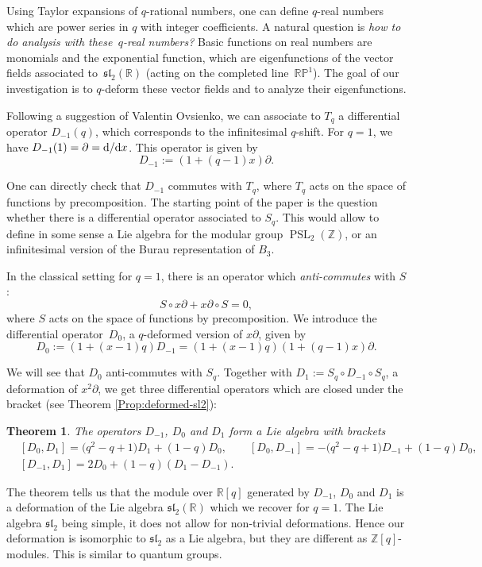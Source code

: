 \documentclass[10pt,a4paper]{amsart}
\numberwithin{equation}{section}
\newtheorem{Theorem}{Theorem}[section]
\newcommand*{\R}{\mathbb{R}}
\newcommand*{\Z}{\mathbb{Z}}
\DeclareMathOperator{\PSL}{PSL}
\begin{document}
Using Taylor expansions of $q$-rational numbers, one can define $q$-real numbers \cite{morier2022q} which are power series in $q$ with integer coefficients. A natural question is \emph{how to do analysis with these~$q$-real numbers?} Basic functions on real numbers are monomials and the exponential function, which are eigenfunctions of the vector fields associated to~$\mathfrak{sl}_2(\R)$ \big(acting on the completed line~$\mathbb{RP}^1$\big). The goal of our investigation is to $q$-deform these vector fields and to analyze their eigenfunctions.

Following a suggestion of Valentin Ovsienko, we can associate to $T_q$ a differential operator $D_{-1}(q)$, which corresponds to the infinitesimal $q$-shift. For $q = 1$, we have ${D_{-1}(1)=\partial={\rm d}/{\rm d}x}$. This operator is given by
\[
D_{-1}:=(1+(q-1)x)\partial.
\]

One can directly check that $D_{-1}$ commutes with $T_q$, where $T_q$ acts on the space of functions by precomposition.
The starting point of the paper is the question whether there is a differential operator associated to $S_q$. This would allow to define in some sense a Lie algebra for the modular group $\PSL_2(\Z)$, or an infinitesimal version of the Burau representation of $B_3$.


In the classical setting for $q=1$, there is an operator which \emph{anti-commutes} with $S$:
\[
S\circ x\partial+x\partial\circ S = 0,
\]
where $S$ acts on the space of functions by precomposition.
We introduce the differential operator~$D_0$, a $q$-deformed version of $x\partial$, given by
\[D_0:=(1+(x-1)q)D_{-1}=(1+(x-1)q)(1+(q-1)x)\partial.
\]

We will see that $D_0$ anti-commutes with $S_q$. Together with $D_1:=S_q\circ D_{-1}\circ S_q$, a deformation of $x^2\partial$, we get three differential operators which are closed under the bracket (see Theorem \ref{Prop:deformed-sl2}):
\begin{Theorem}
The operators $D_{-1}$, $D_0$ and $D_1$ form a Lie algebra with brackets
\begin{align*}
&[D_0,D_1]= \big(q^2-q+1\big)D_1+(1-q)D_0, \qquad
[D_0,D_{-1}] = -\big(q^2-q+1\big)D_{-1}+(1-q)D_0, \\
&[D_{-1},D_1]= 2D_0+(1-q)(D_{1}-D_{-1}).
\end{align*}
\end{Theorem}
The theorem tells us that the module over $\R[q]$ generated by $D_{-1}$, $D_0$ and $D_1$ is a deformation of the Lie algebra $\mathfrak{sl}_2(\R)$ which we recover for $q=1$. The Lie algebra $\mathfrak{sl}_2$ being simple, it does not allow for non-trivial deformations. Hence our deformation is isomorphic to $\mathfrak{sl}_2$ as a Lie algebra, but they are different as $\mathbb{Z}[q]$-modules. This is similar to quantum groups.
\end{document}
